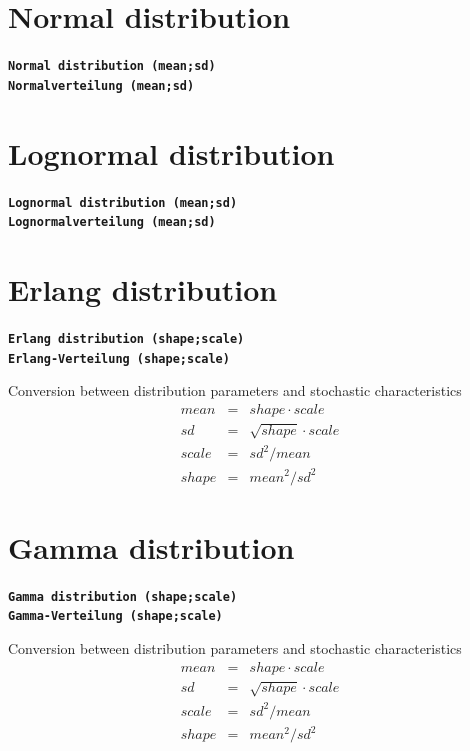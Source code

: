 \documentclass{svmono}
\def\cm#1{\textbf{\texttt{#1}}}
\begin{document}
\section*{Normal distribution}
\cm{Normal distribution (mean;sd)}~\\
\cm{Normalverteilung (mean;sd)}





\section*{Lognormal distribution}
\cm{Lognormal distribution (mean;sd)}~\\
\cm{Lognormalverteilung (mean;sd)}





\section*{Erlang distribution}
\cm{Erlang distribution (shape;scale)}~\\
\cm{Erlang-Verteilung (shape;scale)}

Conversion between distribution parameters and stochastic characteristics
\begin{eqnarray*}
mean&=&shape\cdot scale\\
sd&=&\sqrt{shape}\cdot scale\\
scale&=&sd^2/mean\\
shape&=&mean^2/sd^2
\end{eqnarray*}





\section*{Gamma distribution}
\cm{Gamma distribution (shape;scale)}~\\
\cm{Gamma-Verteilung (shape;scale)}

Conversion between distribution parameters and stochastic characteristics
\begin{eqnarray*}
mean&=&shape\cdot scale\\
sd&=&\sqrt{shape}\cdot scale\\
scale&=&sd^2/mean\\
shape&=&mean^2/sd^2
\end{eqnarray*}
\end{document}
